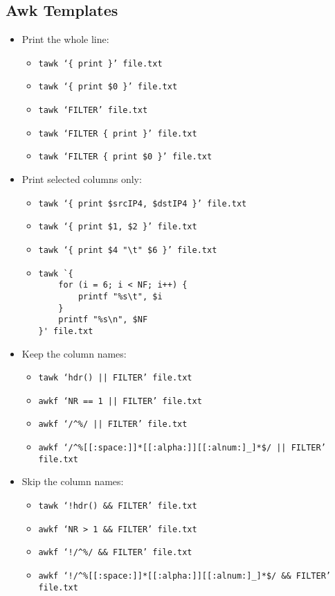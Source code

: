 \documentclass[documentation]{subfiles}
\begin{document}
\subsection{Awk Templates}
\begin{itemize}
    \item Print the whole line:
        \begin{itemize}
            \item {\tt tawk `\{ print \}' file.txt}
            \item {\tt tawk `\{ print \$0 \}' file.txt}
            \item {\tt tawk `FILTER' file.txt}
            \item {\tt tawk `FILTER \{ print \}' file.txt}
            \item {\tt tawk `FILTER \{ print \$0 \}' file.txt}
        \end{itemize}
    \item Print selected columns only:
        \begin{itemize}
            \item {\tt tawk `\{ print \$srcIP4, \$dstIP4 \}' file.txt}
            \item {\tt tawk `\{ print \$1, \$2 \}' file.txt}
            \item {\tt tawk `\{ print \$4 "\textbackslash{}t" \$6 \}' file.txt}
            \item \begin{verbatim}
tawk `{
    for (i = 6; i < NF; i++) {
        printf "%s\t", $i
    }
    printf "%s\n", $NF
}' file.txt
\end{verbatim}
        \end{itemize}
    \item Keep the column names:
        \begin{itemize}
            \item {\tt tawk `hdr() || FILTER' file.txt}
            \item {\tt awkf `NR == 1 || FILTER' file.txt}
            \item {\tt awkf `/\textasciicircum{}\%/ || FILTER' file.txt}
            \item {\tt awkf `/\textasciicircum{}\%[[:space:]]*[[:alpha:]][[:alnum:]\_]*\$/ || FILTER' file.txt}
        \end{itemize}

    \item Skip the column names:
        \begin{itemize}
            \item {\tt tawk `!hdr() \&\& FILTER' file.txt}
            \item {\tt awkf `NR > 1 \&\& FILTER' file.txt}
            \item {\tt awkf `!/\textasciicircum{}\%/ \&\& FILTER' file.txt}
            \item {\tt awkf `!/\textasciicircum{}\%[[:space:]]*[[:alpha:]][[:alnum:]\_]*\$/ \&\& FILTER' file.txt}
        \end{itemize}


\end{itemize}
\end{document}
